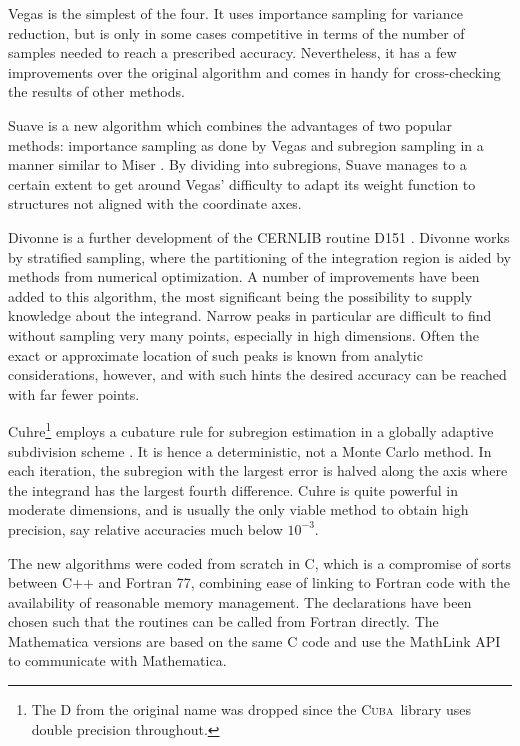 \documentclass[12pt]{article}
\newcommand\cuba{\textsc{Cuba}}
\begin{document}
Vegas is the simplest of the four.  It uses importance sampling for
variance reduction, but is only in some cases competitive in terms of
the number of samples needed to reach a prescribed accuracy. 
Nevertheless, it has a few improvements over the original algorithm
\cite{Vegas1,Vegas2} and comes in handy for cross-checking the results
of other methods.

Suave is a new algorithm which combines the advantages of two popular
methods: importance sampling as done by Vegas and subregion sampling in
a manner similar to Miser \cite{Miser}.  By dividing into subregions,
Suave manages to a certain extent to get around Vegas' difficulty to
adapt its weight function to structures not aligned with the coordinate
axes.

Divonne is a further development of the CERNLIB routine D151
\cite{Divonne}.  Divonne works by stratified sampling, where the
partitioning of the integration region is aided by methods from
numerical optimization.  A number of improvements have been added to
this algorithm, the most significant being the possibility to supply
knowledge about the integrand.  Narrow peaks in particular are difficult
to find without sampling very many points, especially in high
dimensions.  Often the exact or approximate location of such peaks is
known from analytic considerations, however, and with such hints the
desired accuracy can be reached with far fewer points.

Cuhre\footnote{%
	The D from the original name was dropped since the \cuba\ 
	library uses double precision throughout.}
employs a cubature rule for subregion estimation in a globally adaptive
subdivision scheme \cite{dcuhre}.  It is hence a deterministic, not a
Monte Carlo method.  In each iteration, the subregion with the largest
error is halved along the axis where the integrand has the largest
fourth difference.  Cuhre is quite powerful in moderate dimensions, and
is usually the only viable method to obtain high precision, say relative
accuracies much below $10^{-3}$.

The new algorithms were coded from scratch in C, which is a compromise
of sorts between C++ and Fortran 77, combining ease of linking to
Fortran code with the availability of reasonable memory management.  The
declarations have been chosen such that the routines can be called from
Fortran directly.  The Mathematica versions are based on the same C code
and use the MathLink API to communicate with Mathematica.

\end{document}

